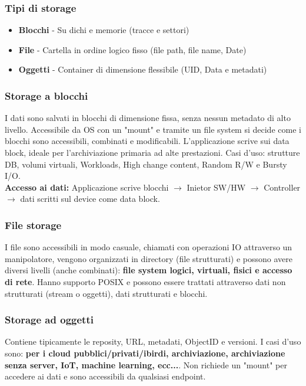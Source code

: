\documentclass[8pt,a4paper]{article}
\begin{document}
\begin{multicols*}{4}
	 	\subsubsection{Tipi di storage}
	 		\begin{itemize}
	 			\item \textbf{Blocchi} - Su dichi e memorie (tracce e settori)
	 			\item \textbf{File} - Cartella in ordine logico fisso (file path, file name, Date)
	 			\item \textbf{Oggetti}  - Container di dimensione flessibile (UID, Data e metadati)
	 		\end{itemize}
	 		\subsubsection{Storage a blocchi}
	 		I dati sono salvati in blocchi di dimensione fissa, senza nessun metadato di alto livello. Accessibile da OS con un "mount" e tramite un file system si decide come i blocchi sono accessibili, combinati e modificabili. L'applicazione scrive sui data block, ideale per l'archiviazione primaria ad alte prestazioni. Casi d'uso: strutture DB, volumi virtuali, Workloads, High change content, Random R/W e Bursty I/O.\\
	 		\textbf{Accesso ai dati:} Applicazione scrive blocchi $\to$ Inietor SW/HW $\to$ Controller $\to$ dati scritti sul device come data block.

	 		\subsubsection{File storage}
	 		I file sono accessibili in modo casuale, chiamati con operazioni IO attraverso un manipolatore, vengono organizzati in directory (file strutturati) e possono avere diversi livelli (anche combinati): \textbf{file system logici, virtuali, fisici e accesso di rete}. Hanno supporto POSIX e possono essere trattati attraverso dati non strutturati (stream o oggetti), dati strutturati e blocchi.
	 		
	 		\subsubsection{Storage ad oggetti}
	 		Contiene tipicamente le reposity, URL, metadati, ObjectID e versioni. I casi d'uso sono: \textbf{per i cloud pubblici/privati/ibirdi, archiviazione, archiviazione senza server, IoT, machine learning,  ecc...}. Non richiede un "mount" per accedere ai dati e sono accessibili da qualsiasi endpoint.

\end{multicols*}
\end{document}
